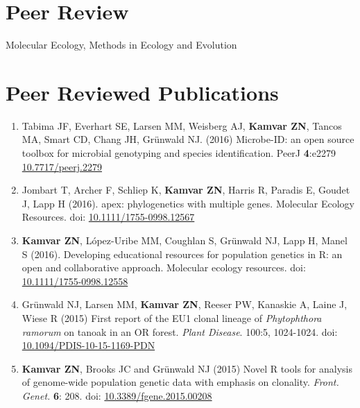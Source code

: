 \section{Peer Review}

Molecular Ecology, Methods in Ecology and Evolution

\section{Peer Reviewed Publications}

\begin{enumerate}[leftmargin = 14pt]

	\item Tabima JF, Everhart SE, Larsen MM, Weisberg AJ, \textbf{Kamvar ZN}, Tancos MA,
	Smart CD, Chang JH, Gr\"unwald NJ. (2016) Microbe-ID: an open source toolbox
	for microbial genotyping and species identification. PeerJ \textbf{4}:e2279
	\href{https://doi.org/10.7717/peerj.2279}{10.7717/peerj.2279}
	
	\item Jombart T, Archer F, Schliep K, \textbf{Kamvar ZN}, Harris R, Paradis
	E, Goudet J, Lapp H (2016). apex: phylogenetics with multiple genes.
	Molecular Ecology Resources. doi:
	\href{http://dx.doi.org/10.1111/1755-0998.12567}{10.1111/1755-0998.12567}

	\item \textbf{Kamvar ZN}, L\'opez-Uribe MM, Coughlan S, Gr\"unwald NJ, Lapp
	H, Manel S (2016). Developing educational resources for population genetics
	in R: an open and collaborative approach. Molecular ecology resources. doi:
	\href{http://dx.doi.org/10.1111/1755-0998.12558}{10.1111/1755-0998.12558}

	\item Gr\"unwald NJ, Larsen MM, \textbf{Kamvar ZN}, Reeser PW, Kanaskie A,
	Laine J, Wiese R (2015) First report of the EU1 clonal lineage of
	\textit{Phytophthora ramorum} on tanoak in an OR forest. 
	\textit{Plant Disease}. 100:5, 1024-1024. doi:
	\href{http://dx.doi.org/10.1094/PDIS-10-15-1169-PDN}{10.1094/PDIS-10-15-1169-PDN}

	\vspace{6pt}

	\item \textbf{Kamvar ZN}, Brooks JC and Gr\"unwald NJ (2015) Novel R tools for
	analysis of genome-wide population genetic data with emphasis on clonality.
	\textit{Front. Genet.} \textbf{6}: 208. doi: 
	\href{http://dx.doi.org/10.3389/fgene.2015.00208}{10.3389/fgene.2015.00208}


\end{enumerate}
